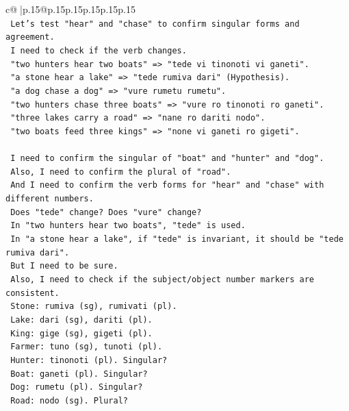 \documentclass{article}
\begin{document}
{\begin{supertabular}{c@{$\;$}|p{.15\linewidth}@{}p{.15\linewidth}p{.15\linewidth}p{.15\linewidth}p{.15\linewidth}p{.15\linewidth}}
{{{\\ 
\texttt{   Let's test "hear" and "chase" to confirm singular forms and agreement.} \\
\texttt{   I need to check if the verb changes.} \\
\texttt{   "two hunters hear two boats" => "tede vi tinonoti vi ganeti".} \\
\texttt{   "a stone hear a lake" => "tede rumiva dari" (Hypothesis).} \\
\texttt{   "a dog chase a dog" => "vure rumetu rumetu".} \\
\texttt{   "two hunters chase three boats" => "vure ro tinonoti ro ganeti".} \\
\texttt{   "three lakes carry a road" => "nane ro dariti nodo".} \\
\texttt{   "two boats feed three kings" => "none vi ganeti ro gigeti".} \\
\\ 
\texttt{   I need to confirm the singular of "boat" and "hunter" and "dog".} \\
\texttt{   Also, I need to confirm the plural of "road".} \\
\texttt{   And I need to confirm the verb forms for "hear" and "chase" with different numbers.} \\
\texttt{   Does "tede" change? Does "vure" change?} \\
\texttt{   In "two hunters hear two boats", "tede" is used.} \\
\texttt{   In "a stone hear a lake", if "tede" is invariant, it should be "tede rumiva dari".} \\
\texttt{   But I need to be sure.} \\
\texttt{   Also, I need to check if the subject/object number markers are consistent.} \\
\texttt{   Stone: rumiva (sg), rumivati (pl).} \\
\texttt{   Lake: dari (sg), dariti (pl).} \\
\texttt{   King: gige (sg), gigeti (pl).} \\
\texttt{   Farmer: tuno (sg), tunoti (pl).} \\
\texttt{   Hunter: tinonoti (pl). Singular?} \\
\texttt{   Boat: ganeti (pl). Singular?} \\
\texttt{   Dog: rumetu (pl). Singular?} \\
\texttt{   Road: nodo (sg). Plural?} \\
\\ 
}}}
\end{supertabular}}
\end{document}
